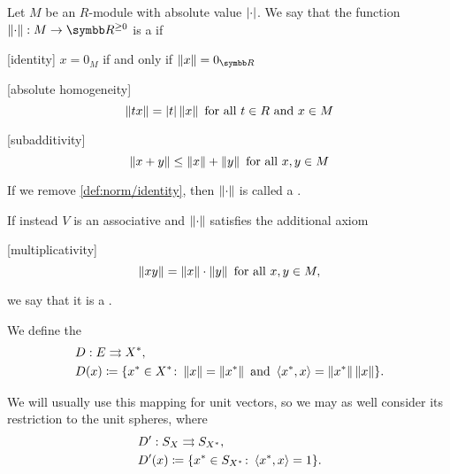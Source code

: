 \begin{definition}\label{def:norm}
  Let \( M \) be an \( R \)-module with absolute value \( \left\vert \cdot \right\vert \). We say that the function \( \Norm{\cdot}: M \to \R^{\geq 0} \) is a  if
  \begin{description}
    [identity] \( x = 0_M \) if and only if \( \Norm x = 0_{\R} \)

    [absolute homogeneity]
    \begin{equation*}
      \left\Vert t x \right\Vert = \left\vert t \right\vert \left\Vert x \right\Vert \text{ for all } t \in R \text{ and } x \in M
    \end{equation*}

    [subadditivity] 
    \begin{equation*}
      \left\Vert x + y \right\Vert \leq \left\Vert x \right\Vert + \left\Vert y \right\Vert \text{ for all } x, y \in M
    \end{equation*}
  \end{description}

  If we remove \ref{def:norm/identity}, then \( \left\Vert \cdot \right\Vert \) is called a .

  If instead \( V \) is an associative and \( \left\Vert \cdot \right\Vert \) satisfies the additional axiom
  \begin{description}
    [multiplicativity]
    \begin{equation*}
      \left\Vert xy \right\Vert = \left\Vert x \right\Vert \cdot \left\Vert y \right\Vert \text{ for all } x, y \in M,
    \end{equation*}
  \end{description}
  we say that it is a .
\end{definition}

\begin{definition}\cite[Example 2.26]{Phelps1993}
  We define the 
  \begin{align*}
    &D: E \rightrightarrows X^*, \\
    &D(x) \coloneqq \{ x^* \in X^* \colon \left\Vert x \right\Vert = \left\Vert x^* \right\Vert \text{ and } \left\langle x^*, x \right\rangle = \left\Vert x^* \right\Vert \left\Vert x \right\Vert \}.
  \end{align*}
\end{definition}

\begin{remark}
  We will usually use this mapping for unit vectors, so we may as well consider its restriction to the unit spheres, where
  \begin{align*}
    &D': S_X \rightrightarrows S_{X^*}, \\
    &D'(x) \coloneqq \{ x^* \in S_{X^*} \colon \left\langle x^*, x \right\rangle = 1 \}.
  \end{align*}
\end{remark}

